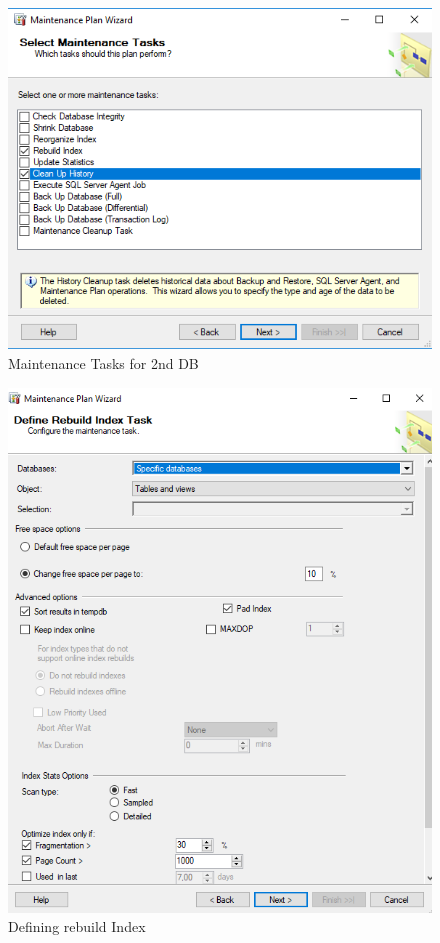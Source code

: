 \documentclass[12pt]{article}
\begin{document}
        
        \begin{figure}[H]
                \centering
                \includegraphics[width=.95\textwidth]{img11.png}
                \caption{Maintenance Tasks for 2nd DB}
        \end{figure}
        \vspace{0.5 cm}

        
        \begin{figure}[H]
                \centering
                \includegraphics[width=.95\textwidth]{img12.png}
                \caption{Defining rebuild Index}
        \end{figure}
        \vspace{0.5 cm}
\end{document}
